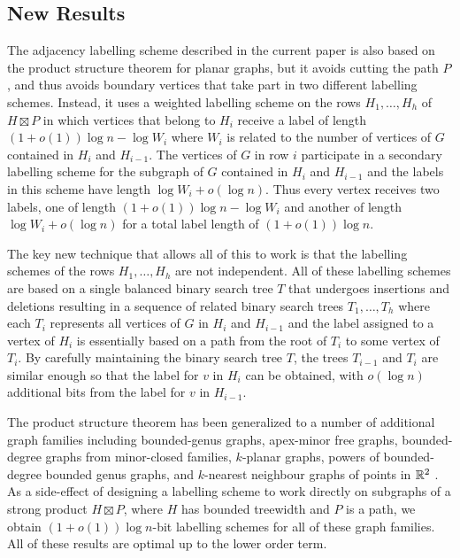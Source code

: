 \documentclass[kpfonts]{patmorin}
\begin{document}
\subsection{New Results}

The adjacency labelling scheme described in the current paper is also based on the product structure theorem for planar graphs, but it avoids cutting the path $P$, and thus avoids boundary vertices that take part in two different labelling schemes.  Instead, it uses a weighted labelling scheme on the rows $H_1,\ldots,H_h$ of $H\boxtimes P$ in which vertices that belong to $H_i$ receive a label of length $(1+o(1))\log n-\log W_i$ where $W_i$ is related to the number of vertices of $G$ contained in $H_i$ and $H_{i-1}$.  The vertices of $G$ in row $i$ participate in a secondary labelling scheme for the subgraph of $G$ contained in $H_i$ and $H_{i-1}$ and the labels in this scheme have length $\log W_i + o(\log n)$. Thus every vertex receives two labels, one of length $(1+o(1))\log n-\log W_i$ and another of length $\log W_i + o(\log n)$ for a total label length of $(1+o(1))\log n$.

The key new technique that allows all of this to work is that the labelling schemes of the rows $H_1,\ldots,H_h$ are not independent.  All of these labelling schemes are based on a single balanced binary search tree $T$ that undergoes insertions and deletions resulting in a sequence of related binary search trees $T_1,\ldots,T_h$ where each $T_i$ represents all vertices of $G$ in $H_{i}$ and $H_{i-1}$ and the label assigned to a vertex of $H_i$ is essentially based on a path from the root of $T_i$ to some vertex of $T_i$.  By carefully maintaining the binary search tree $T$, the trees $T_{i-1}$ and $T_{i}$ are similar enough so that the label for $v$ in $H_i$ can be obtained, with $o(\log n)$ additional bits from the label for $v$ in $H_{i-1}$.

The product structure theorem has been generalized to a number of additional graph families including bounded-genus graphs, apex-minor free graphs, bounded-degree graphs from minor-closed families, $k$-planar graphs, powers of bounded-degree bounded genus graphs, and $k$-nearest neighbour graphs of points in $\mathbb{R}^2$ \cite{dujmovic.joret.ea:planar,dujmovic.morin.ea:structure}. As a side-effect of designing a labelling scheme to work directly on subgraphs of a strong product $H\boxtimes P$, where $H$ has bounded treewidth and $P$ is a path,
we obtain $(1+o(1))\log n$-bit labelling schemes for all of these graph families.  All of these results are optimal up to the lower order term.
\end{document}
